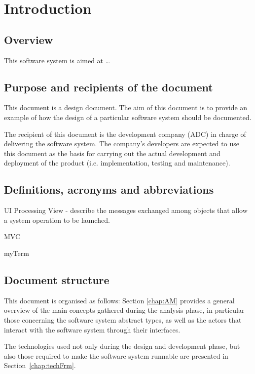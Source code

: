 \chapter{Introduction}
\label{chap:introduction}


\section{Overview}
This software system is aimed at \ldots




\section{Purpose and recipients of the document}
This document is a design document. The aim of this document is to provide an
example of how the design of a particular software system should be documented. 

The recipient of this document is the development company (ADC) in charge
of delivering the software system. The company's developers are
expected to use this document as the basis for carrying out the actual
development and deployment of the product (i.e. implementation, testing
and maintenance).





\section{Definitions, acronyms and abbreviations}
UI Processing View - describe the messages exchanged among objects that allow a
system operation to be launched.

\gls{MVC}

\gls{myTerm}

  
\section{Document structure} 
This document is organised as follows: Section \ref{chap:AM} provides a general
overview of the main concepts gathered during the analysis phase, in particular those concerning the software system abstract
types, as well as the actors that interact with the
software system through their interfaces. 

The technologies used not only during the design and development phase, but 
also those required to make the software system runnable are presented in
Section~\ref{chap:techFrm}.

